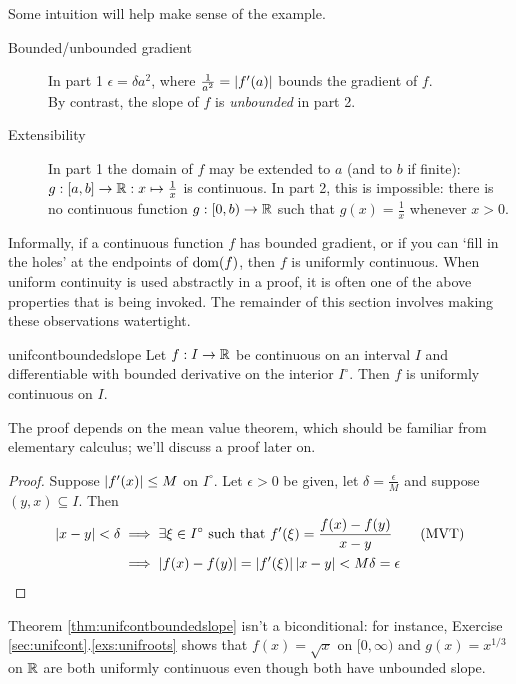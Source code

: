 Some intuition will help make sense of the example.
\begin{description}
	\item[Bounded/unbounded gradient] In part 1 $\epsilon=\delta{a^2}$, where $\frac 1{a^2}=\left| f'(a)\right|$ bounds the gradient of $f$.\\
	By contrast, the slope of $f$ is \emph{unbounded} in part 2.
	\item[Extensibility] In part 1 the domain of $f$ may be extended to $a$ (and to $b$ if finite): $g:[a,b]\to\mathbb{R}:x\mapsto \frac 1x$ is continuous.
	In part 2, this is impossible: there is no continuous function $g:[0,b)\to\mathbb{R}$ such that $g(x)=\frac 1x$ whenever $x>0$.
\end{description}
Informally, if a continuous function $f$ has bounded gradient, or if you can `fill in the holes' at the endpoints of $\operatorname{dom}(f)$, then $f$ is uniformly continuous. When uniform continuity is used abstractly in a proof, it is often one of the above properties that is being invoked. The remainder of this section involves making these observations watertight.


\goodbreak


\begin{thm}{}{unifcontboundedslope}
	Let $f:I\to\mathbb{R}$ be continuous on an interval $I$ and differentiable with bounded derivative on the interior $I^\circ$. Then $f$ is uniformly continuous on $I$.
\end{thm}

The proof depends on the mean value theorem, which should be familiar from elementary calculus; we'll discuss a proof later on.

\begin{proof}
	Suppose $\left| f'(x)\right|\le M$ on $I^\circ$. Let $\epsilon>0$ be given, let $\delta=\frac\epsilon M$ and suppose $(y,x)\subseteq I$. Then
	\begin{align*}
	\left| x-y\right|<\delta&\implies \exists \xi\in I^\circ\text{ such that }f'(\xi)=\frac{f(x)-f(y)}{x-y} \tag{MVT}\\
	&\implies \left| f(x)-f(y)\right|=\left| f'(\xi)\right|\left| x-y\right|<M\delta=\epsilon \tag*{\qedhere}
	\end{align*}
\end{proof}


Theorem \ref{thm:unifcontboundedslope} isn't a biconditional: for instance, Exercise \ref*{sec:unifcont}.\ref{exs:unifroots} shows that $f(x)=\sqrt x$ on $[0,\infty)$ and $g(x)=x^{1/3}$ on $\mathbb{R}$ are both uniformly continuous even though both have unbounded slope.\medbreak

